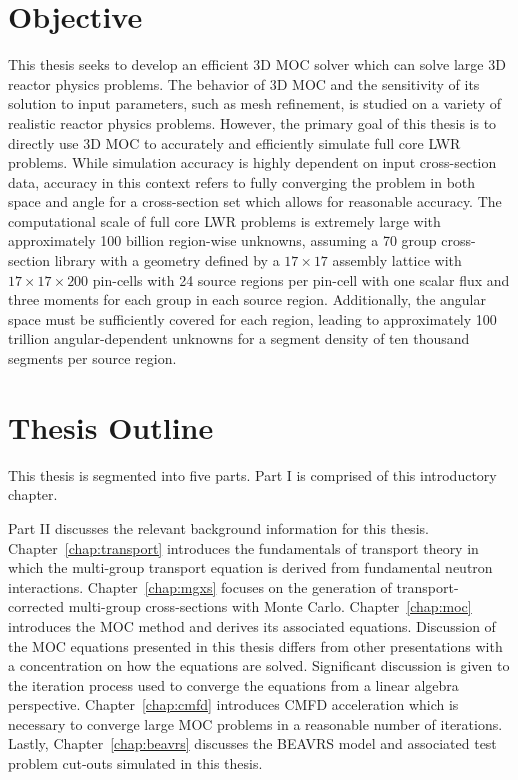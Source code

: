 \section{Objective}

This thesis seeks to develop an efficient 3D \ac{MOC} solver which can solve large 3D reactor physics problems. The behavior of 3D \ac{MOC} and the sensitivity of its solution to input parameters, such as mesh refinement, is studied on a variety of realistic reactor physics problems. However, the primary goal of this thesis is to directly use 3D \ac{MOC} to accurately and efficiently simulate full core \ac{LWR} problems. While simulation accuracy is highly dependent on input cross-section data, accuracy in this context refers to fully converging the problem in both space and angle for a cross-section set which allows for reasonable accuracy. The computational scale of full core \ac{LWR} problems is extremely large with approximately 100 billion region-wise unknowns, assuming a 70 group cross-section library with a geometry defined by a $17 \times 17$ assembly lattice with $17 \times 17 \times 200$ pin-cells with 24 source regions per pin-cell with one scalar flux and three moments for each group in each source region. Additionally, the angular space must be sufficiently covered for each region, leading to approximately 100 trillion angular-dependent unknowns for a segment density of ten thousand segments per source region.

\section{Thesis Outline}

This thesis is segmented into five parts. Part I is comprised of this introductory chapter.

Part II discusses the relevant background information for this thesis. Chapter~\ref{chap:transport} introduces the fundamentals of transport theory in which the multi-group transport equation is derived from fundamental neutron interactions. Chapter~\ref{chap:mgxs} focuses on the generation of transport-corrected multi-group cross-sections with Monte Carlo. Chapter~\ref{chap:moc} introduces the \ac{MOC} method and derives its associated equations. Discussion of the \ac{MOC} equations presented in this thesis differs from other presentations with a concentration on how the equations are solved. Significant discussion is given to the iteration process used to converge the equations from a linear algebra perspective. Chapter~\ref{chap:cmfd} introduces \ac{CMFD} acceleration which is necessary to converge large \ac{MOC} problems in a reasonable number of iterations. Lastly, Chapter~\ref{chap:beavrs} discusses the BEAVRS model and associated test problem cut-outs simulated in this thesis.

